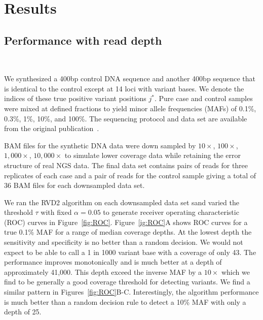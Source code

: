 \documentclass[11pt,reqno]{amsart}
\begin{document}
\section{Results}

\subsection{Performance with read depth}\

We synthesized a 400bp control DNA sequence and another 400bp sequence that is identical to the control except at 14 loci with variant bases. We denote the indices of these true positive variant positions $j^*$. Pure case and control samples were mixed at defined fractions to yield minor allele frequencies (MAFs) of 0.1\%, 0.3\%, 1\%, 10\%, and 100\%. The sequencing protocol and data set are available from the original publication~\cite{}.

BAM files for the synthetic DNA data were down sampled by $10\times$, $100\times$, $1,000\times$, $10,000\times$ to simulate lower coverage data while retaining the error structure of real NGS data. The final data set contains pairs of reads for three replicates of each case and a pair of reads for the control sample giving a total of 36 BAM files for each downsampled data set.

We ran the RVD2 algorithm on each downsampled data set sand varied the threshold $\tau$ with fixed $\alpha=0.05$ to generate receiver operating characteristic (ROC) curves in Figure~\ref{fig:ROC}. Figure~\ref{ig:ROC}A shows ROC curves for a true 0.1\% MAF for a range of median coverage depths. At the lowest depth the sensitivity and specificity is no better than a random decision. We would not expect to be able to call a 1 in 1000 variant base with a coverage of only 43. The performance improves monotonically and is much better at a depth of approximately 41,000. This depth exceed the inverse MAF by a $10\times$ which we find to be generally a good coverage threshold for detecting variants. We find a similar pattern in Figures~\ref{fig:ROC}B-C. Interestingly, the algorithm performance is much better than a random decision rule to detect a 10\% MAF with only a depth of 25.
\end{document}
